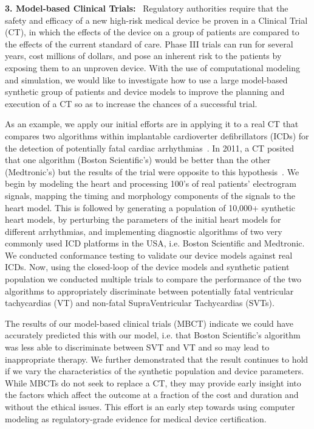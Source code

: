 \textbf{3. Model-based Clinical Trials:}
~Regulatory authorities require that the safety and efficacy of a new high-risk medical device be proven in a Clinical Trial (CT), in which the effects of the device on a group of patients are compared to the effects of the current standard of care. 
Phase III trials can run for several years, cost millions of dollars, and pose an inherent risk to the patients by exposing them to an unproven device.
With the use of computational modeling and simulation, we would like to investigate how to use a large model-based synthetic group of patients and device models to improve the planning and execution of a CT so as to increase the chances of a successful trial.

As an example, we apply our initial efforts are in applying it to a real CT that compares two algorithms within implantable cardioverter defibrillators (ICDs) for the detection of potentially fatal cardiac arrhythmias~\cite{RIGHT}. 
In 2011, a CT posited that one algorithm (Boston Scientific's) would be better than the other (Medtronic's) but the results of the trial were opposite to this hypothesis~\cite{RIGHTresults}. 
We begin by modeling the heart and processing 100's of real patients' electrogram signals, mapping the timing and morphology components of the signals to the heart model. 
This is followed by generating a population of 10,000+ synthetic heart models, by perturbing the parameters of the initial heart models for different arrhythmias, and implementing diagnostic algorithms of two very commonly used ICD platforms in the USA, i.e. Boston Scientific and Medtronic.
We conducted conformance testing to validate our device models against real ICDs. 
Now, using the closed-loop of the device models and synthetic patient population we conducted multiple trials to compare the performance of the two algorithms to appropriately discriminate between potentially fatal ventricular tachycardias (VT) and non-fatal SupraVentricular Tachycardias (SVTs). 

The results of our model-based clinical trials (MBCT) indicate we could have accurately predicted this with our model, i.e. that Boston Scientific's algorithm was less able to discriminate between SVT and VT and so may lead to inappropriate therapy.
We further demonstrated that the result continues to hold if we vary the characteristics of the synthetic population and device parameters.
While MBCTs do not seek to replace a CT, they may provide early insight into the factors which affect the outcome at a fraction of the cost and duration and without the ethical issues.
This effort is an early step towards using computer modeling as regulatory-grade evidence for medical device certification. 

 